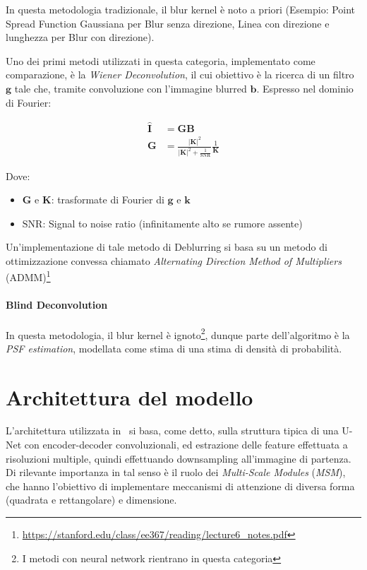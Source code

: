 \documentclass[a4paper,10pt,twocolumn]{article}
\begin{document}
In questa metodologia tradizionale, il blur kernel \`e noto a priori (Esempio: Point Spread Function Gaussiana per Blur senza direzione, Linea con direzione e lunghezza per Blur con direzione).\par
Uno dei primi metodi utilizzati in questa categoria, implementato come comparazione, \`e la \textit{Wiener Deconvolution}, il cui obiettivo \`e la ricerca di un filtro $\bm{g}$ tale che, tramite
convoluzione con l'immagine blurred $\bm{b}$. Espresso nel dominio di Fourier:

\begin{align}
  \hat{\bm{I}} &= \bm{G}\bm{B} \\
  \bm{G}       &= \frac{|\bm{K}|^2}{|\bm{K}|^2+\frac{1}{\mathrm{SNR}}} \frac{1}{\bm{K}}
\end{align}

Dove:

\begin{itemize}[topsep=0pt, noitemsep]
  \item[] $\bm{G}$ e $\bm{K}$: trasformate di Fourier di $\bm{g}$ e $\bm{k}$
  \item[] $\mathrm{SNR}$: Signal to noise ratio (infinitamente alto se rumore assente)
\end{itemize}

Un'implementazione di tale metodo di Deblurring si basa su un metodo di ottimizzazione convessa chiamato \textit{Alternating Direction Method of Multipliers} (ADMM)\footnote{\url{https://stanford.edu/class/ee367/reading/lecture6_notes.pdf}}

\paragraph*{Blind Deconvolution}

In questa metodologia, il blur kernel \`e ignoto\footnote{I metodi con neural network rientrano in questa categoria}, dunque parte dell'algoritmo \`e la \textit{PSF estimation}, modellata come
stima di una stima di densit\`a di probabilit\`a.

\section{Architettura del modello}
L'architettura utilizzata in~\cite{convir} si basa, come detto, sulla struttura tipica di una U-Net con encoder-decoder convoluzionali, ed estrazione delle feature effettuata a risoluzioni multiple, quindi effettuando downsampling all'immagine di partenza.
Di rilevante importanza in tal senso è il ruolo dei \textit{Multi-Scale Modules} (\textit{MSM}), che hanno l'obiettivo di implementare meccanismi di attenzione di diversa forma (quadrata e rettangolare) e dimensione.
\end{document}
